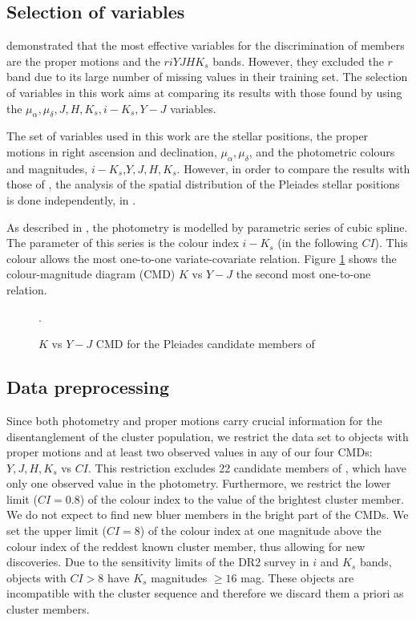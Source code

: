 \subsection{Selection of variables}
\citet{Sarro2014} demonstrated that the most effective variables for the discrimination of members are the proper motions and the $riYJHK_s$ bands. However, they excluded the $r$ band due to its large number of missing values in their training set. The selection of variables in this work aims at comparing its results with those found by \citet{Bouy2015} using the $\mu_{\alpha},\mu_{\delta},J,H,K_s,i-K_s,Y-J$ variables. 

The set of variables used in this work are the stellar positions, the proper motions in right ascension and declination, $\mu_{\alpha},\mu_{\delta}$, and the photometric colours and magnitudes, $i-K_s$,$Y,J,H,K_s$. However, in order to compare the results with those of \citet{Bouy2015}, the analysis of the spatial distribution of the Pleiades stellar positions is done independently, in \citet{Olivares2017b}.

As described in \citet{Olivares2017}, the photometry is modelled by parametric series of cubic spline. The parameter of this series is the colour index $i-K_s$ (in the following $CI$). This colour allows the most one-to-one variate-covariate relation. Figure \ref{fig:otherCI} shows the colour-magnitude diagram (CMD) $K$ vs $Y-J$ the second most one-to-one relation.


\begin{figure}[htbp]
\begin{center}
\caption{$K$ vs $Y-J$ CMD for the Pleiades candidate members of \citet{Bouy2015}}.
\label{fig:otherCI}
\end{center}
\end{figure}

\subsection{Data preprocessing}
 Since both photometry and proper motions carry crucial information for the disentanglement of the cluster population, we restrict the data set to objects with proper motions and at least two observed values in any of our four CMDs: $Y,J,H,K_s$ vs $CI$. This restriction excludes 22 candidate members of \citet{Bouy2015}, which have only one observed value in the photometry. Furthermore, we restrict the lower limit ($CI =0.8$) of the colour index to the value of the brightest cluster member. We do not expect to find new bluer members in the bright part of the CMDs. We set the upper limit ($CI=8$) of the colour index at one magnitude above the colour index of the reddest known cluster member, thus allowing for new discoveries. Due to the sensitivity limits of the DR2 survey in $i$ and $K_s$ bands, objects with $CI>8$ have $K_s$ magnitudes $\geq 16$ mag. These objects are incompatible with the cluster sequence and therefore we discard them a priori as cluster members.

